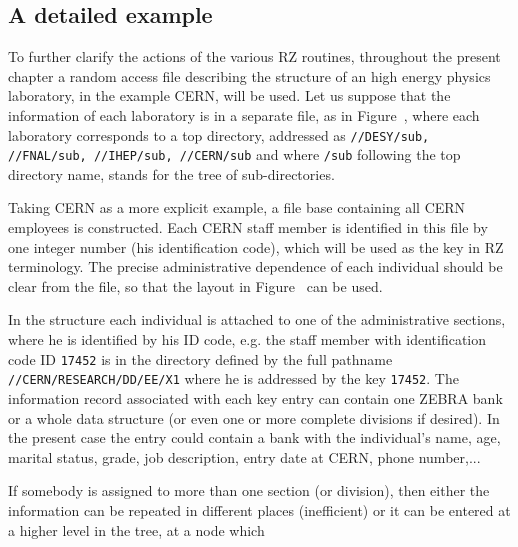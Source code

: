 \subsection{A detailed example}
\par To further clarify the actions of the various RZ routines, throughout
the present chapter a random access file describing the structure of
an high energy physics laboratory, in the example CERN, will be used.
Let us suppose that the information of
each laboratory is in a separate file, as in
Figure~\pageref{RZFIG01}, where each laboratory corresponds to a top
directory, addressed as
{\tt //DESY/sub, //FNAL/sub, //IHEP/sub, //CERN/sub}
and where {\tt /sub}
following the top directory name, stands for the tree of sub-directories.
\begin{figure}\label{RZFIG01 FRAME=RULE PLACE=INLINE>
\caption{A RZ based HEP file base}
\end{figure}
\par
Taking CERN as a more explicit example, a file base containing all CERN
employees is constructed. Each CERN staff member is identified in this
file by one integer number (his identification code), which will be used
as the key in RZ terminology. The precise administrative dependence of
each individual should be clear from the file,
so that the layout in Figure~\pageref{RZFIG02} can be used.
\begin{figure}\label{RZFIG02 FRAME=RULE PLACE=INLINE>
\caption{The layout of the RZ file base for CERN}
\end{figure}
\par
In the structure each individual is attached to one of the administrative
sections, where he is identified by his ID code, e.g. the staff
member with identification code ID {\tt 17452} is in the
directory defined by the full pathname
{\tt //CERN/RESEARCH/DD/EE/X1}
where he is addressed by the key
{\tt 17452}.
The information record associated with each key entry can contain one
ZEBRA bank or a whole data structure (or even one or more complete
divisions if desired). In the present case the entry could contain
a bank with the individual's name, age, marital status, grade,
job description, entry date at CERN, phone number,...
\par If somebody is assigned to more than one section (or division), then
either the information can be repeated in different places (inefficient)
or it can be entered at a higher level in the tree, at a node which
